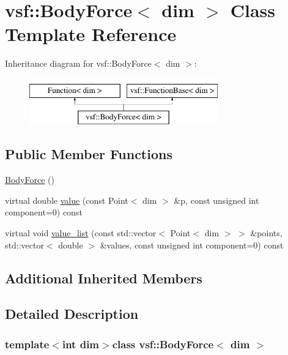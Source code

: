 \hypertarget{classvsf_1_1BodyForce}{\section{vsf\-:\-:Body\-Force$<$ dim $>$ Class Template Reference}
\label{classvsf_1_1BodyForce}
}
Inheritance diagram for vsf\-:\-:Body\-Force$<$ dim $>$\-:\begin{figure}[H]
\begin{center}
\leavevmode
\includegraphics[height=2.000000cm]{classvsf_1_1BodyForce}
\end{center}
\end{figure}
\subsection*{Public Member Functions}
\begin{DoxyCompactItemize}
\item 
\hyperlink{classvsf_1_1BodyForce_ab0e2afab887f5ed138e9505dfd7a5a48}{Body\-Force} ()
\item 
virtual double \hyperlink{classvsf_1_1BodyForce_a02c4d3175f362852168899720754b7c0}{value} (const Point$<$ dim $>$ \&p, const unsigned int component=0) const 
\item 
virtual void \hyperlink{classvsf_1_1BodyForce_a1c23b3aaa12b0f2006cbfc2a1502d2d0}{value\-\_\-list} (const std\-::vector$<$ Point$<$ dim $>$ $>$ \&points, std\-::vector$<$ double $>$ \&values, const unsigned int component=0) const 
\end{DoxyCompactItemize}
\subsection*{Additional Inherited Members}


\subsection{Detailed Description}
\subsubsection*{template$<$int dim$>$class vsf\-::\-Body\-Force$<$ dim $>$}

